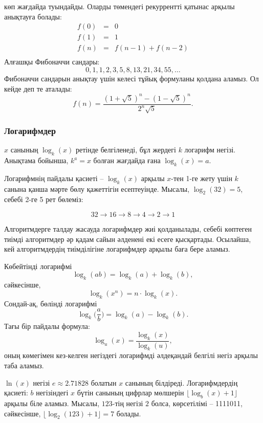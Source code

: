 



 көп жағдайда туындайды. Оларды төмендегі рекуррентті қатынас арқылы анықтауға болады:
\[
\begin{array}{lcl}
f(0) & = & 0 \\
f(1) & = & 1 \\
f(n) & = & f(n-1)+f(n-2) \\
\end{array}
\]
Алғашқы Фибоначчи сандары:
\[0, 1, 1, 2, 3, 5, 8, 13, 21, 34, 55, \ldots\]
Фибоначчи сандарын анықтау үшін келесі тұйық формуланы қолдана аламыз. Ол кейде 
 деп те аталады:
\[f(n)=\frac{(1 + \sqrt{5})^n - (1-\sqrt{5})^n}{2^n \sqrt{5}}.\]

\subsubsection{Логарифмдер}


$x$ санының 
$\log_k(x) $ ретінде белгіленеді, бұл жердегі $k$
логарифм негізі.
Анықтама бойынша,
$k^a=x$ болған жағдайда ғана $\log_k(x)=a$.

Логарифмнің пайдалы қасиеті --
$\log_k(x)$ арқылы $x$-тен 1-ге жету үшін 
$k$ санына қанша мәрте бөлу қажеттігін есептеуінде.
Мысалы, $\log_2(32)=5$,
себебі 2-ге 5 рет бөлеміз:

\[32 \rightarrow 16 \rightarrow 8 \rightarrow 4 \rightarrow 2 \rightarrow 1 \]

Алгоритмдерге талдау жасауда логарифмдер жиі қолданылады, 
себебі көптеген тиімді алгоритмдер әр қадам сайын әлденені 
екі есеге қысқартады.
Осылайша, кей алгоритмдердің тиімділігіне логарифмдер арқылы баға бере аламыз.

Көбейтінді логарифмі 
\[\log_k(ab) = \log_k(a)+\log_k(b),\]
сәйкесінше,
\[\log_k(x^n) = n \cdot \log_k(x).\]
Сондай-ақ, бөлінді логарифмі 
\[\log_k\Big(\frac{a}{b}\Big) = \log_k(a)-\log_k(b).\]
Тағы бір пайдалы формула: 
\[\log_u(x) = \frac{\log_k(x)}{\log_k(u)},\]
оның көмегімен кез-келген негіздегі логарифмді әлдеқандай 
белгілі негіз арқылы таба аламыз.


$\ln(x)$ негізі 
$e \approx 2.71828$ болатын
$x$ санының  білдіреді.
Логарифмдердің қасиеті:
$b$ негізіндегі $x$ бүтін санының цифрлар мөлшерін
$\lfloor \log_b(x)+1 \rfloor$ арқылы біле аламыз.
Мысалы, $123$-тің негізі $2$ болса, 
көрсетілімі -- 1111011, сәйкесінше,
$\lfloor \log_2(123)+1 \rfloor = 7$ болады.


